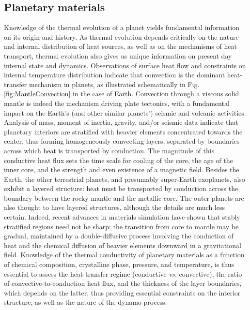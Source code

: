 \salta
\subsection{Planetary materials}
Knowledge of the thermal evolution of a planet yields fundamental information on its origin and history. As thermal evolution depends critically on the nature and internal distribution of heat sources, as well as on the mechanisms of heat transport, thermal evolution also gives us unique information on present day internal state and dynamics. Observations of surface heat flow and constraints on internal temperature distribution indicate that convection is the dominant heat-transfer mechanism in planets,\cite{Hubbard:1984} as illustrated schematically in Fig. \ref{fig:MantleConvection} in the case of Earth. Convection through a viscous solid mantle is indeed the mechanism driving plate tectonics,\cite{Schibert2001} with a fundamental impact on the Earth's (and other similar planets') seismic and volcanic activities.\cite{Duarte2016} Analysis of mass, moment of inertia, gravity, and/or seismic data indicate that planetary interiors are stratified with heavier elements concentrated towards the center,\cite{Fortney2010} thus forming homogeneously convecting layers, separated by boundaries across which heat is transported by conduction. The magnitude of this conductive heat flux sets the time scale for cooling of the core, the age of the inner core, and the strength and even existence of a magnetic field.\cite{Buffet2003} Besides the Earth, the other terrestrial planets, and presumably super-Earth exoplanets, also exhibit a layered structure: heat must be transported by conduction across the boundary between the rocky mantle and the metallic core. The outer planets are also thought to have layered structures, although the details are much less certain. Indeed, recent advances in materials simulation have shown that stably stratified regions need not be sharp: the transition from core to mantle may be gradual, maintained by a double-diffusive process involving the conduction of heat and the chemical diffusion of heavier elements downward in a gravitational field.\cite{Wahl2017} Knowledge of the thermal conductivity of planetary materials as a function of chemical composition, crystalline phase, pressure, and temperature, is thus essential to assess the heat-transfer regime (conductive \emph{vs.} convective), the ratio of convective-to-conduction heat flux, and the thickness of the layer boundaries, which depends on the latter, thus providing essential constraints on the interior structure, as well as the nature of the dynamo process.

